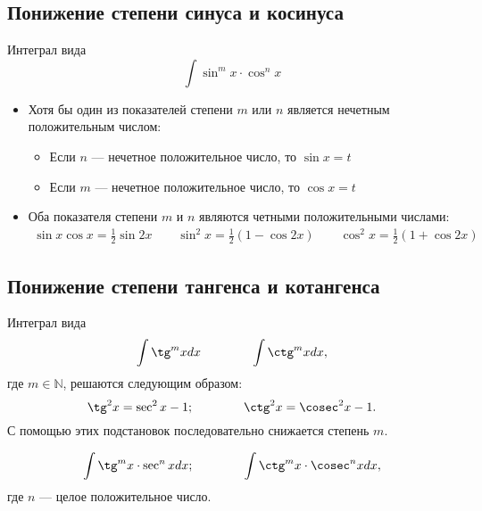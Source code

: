 \documentclass[a4paper,12pt,oneside]{extbook}
\theoremstyle{numbered}
\theoremstyle{unnumbered}
\theoremstyle{named}
\theoremstyle{unnumbered}
\theoremstyle{named}
\theoremstyle{named}
\theoremstyle{named}
\begin{document}
\subsection{Понижение степени синуса и косинуса}%
\label{sub:Понижение степени синуса и косинуса}

Интеграл вида
\begin{equation}
    \int \sin^m{x} \cdot \cos^n{x}
\end{equation}
\begin{itemize}
    \item {
          Хотя бы один из показателей степени \(m\) или \(n\) является нечетным положительным числом:
          \begin{itemize}
              \item {Если \(n\) — нечетное положительное число, то \(\sin{x} = t\)}
              \item {Если \(m\) — нечетное положительное число, то \(\cos{x} = t\)}
          \end{itemize}
          }
    \item {
          Оба показателя степени \(m\) и \(n\) являются четными положительными числами:
          \begin{gather*}
              \sin{x}\cos{x} = \frac{1}{2} \sin{2x}
              \qquad
              \sin^2{x} = \frac{1}{2}(1 - \cos{2x})
              \qquad
              \cos^2{x} = \frac{1}{2}(1 + \cos{2x})
          \end{gather*}
          }
\end{itemize}

\subsection{Понижение степени тангенса и котангенса}%
\label{sub:Понижение степени тангенса и котангенса}

Интеграл вида
\begin{gather*}
    \int \tg^m xdx
    \qquad \qquad
    \int \ctg^m xdx,
\end{gather*}
где \(m \in \mathbb{N}\), решаются следующим образом:
\begin{equation}
    \tg^2{x} = \sec^2{x} - 1;
    \qquad \qquad
    \ctg^2{x} = \cosec^2{x} - 1.
\end{equation}
С помощью этих подстановок последовательно снижается степень \(m\).

\begin{equation}
    \int \tg^m{x} \cdot \sec^n xdx;
    \qquad \qquad
    \int \ctg^m{x} \cdot \cosec^n xdx,
\end{equation}
где \(n\) — целое положительное число.
\end{document}
